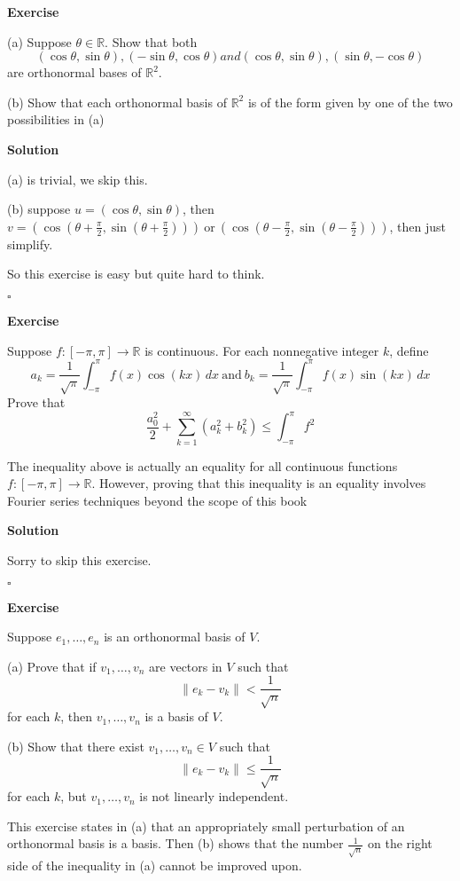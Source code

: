 \documentclass{article}
\newenvironment{exercise}{%
{\textbf{Exercise\\}
    }
}{
}
\newenvironment{solution}{%
{
    \textbf{Solution\\}
    }
}{
  \hfill $\square$ 
  \par\bigskip 
}
\newcommand{\RR}{\mathbb{R}}
\begin{document}
\begin{CJK}{UTF8}{gkai}
\begin{exercise}
    (a) Suppose $\theta \in \RR$. Show that both
    \[(\cos\theta,\sin\theta),(-\sin\theta,\cos\theta) and (\cos\theta,\sin\theta),(\sin\theta,-\cos\theta)\]
    are orthonormal bases of $\RR^2$.

    (b) Show that each orthonormal basis of $\RR^2$ is of the form given by one of the two possibilities in (a)
\end{exercise}

\begin{solution}
    (a) is trivial, we skip this.

    (b) suppose $u = (\cos \theta, \sin \theta)$, then $v = (\cos (\theta + \frac{\pi}{2}, \sin (\theta + \frac{\pi}{2}))) ~\text{or}~ (\cos (\theta - \frac{\pi}{2}, \sin (\theta - \frac{\pi}{2})))$, then just simplify.

    So this exercise is easy but quite hard to think.
\end{solution}
    
\begin{exercise}
    Suppose $f: [-\pi,\pi] \to \RR$ is continuous. For each nonnegative integer $k$, define
    \[a_k = \dfrac{1}{\sqrt{\pi}} \int_{-\pi}^{\pi}f(x)\cos(kx)\, dx ~\text{and}~ b_k = \dfrac{1}{\sqrt{\pi}} \int_{-\pi}^{\pi}f(x)\sin(kx)\, dx\]
    Prove that
    \[\dfrac{a_0^2}{2} + \sum_{k = 1}^\infty (a_k^2 + b_k^2) \leq  \int_{-\pi}^{\pi}f^2\]

    The inequality above is actually an equality for all continuous functions $f : [-\pi,\pi] \to \RR$. However, proving that this inequality is an equality involves Fourier series techniques beyond the scope of this book
\end{exercise}

\begin{solution}
    Sorry to skip this exercise.
\end{solution}

\begin{exercise}
    Suppose $e_1,\ldots,e_n$ is an orthonormal basis of $V$.

    (a) Prove that if $v_1,\ldots,v_n$ are vectors in $V$ such that
    \[\|e_k - v_k\| < \dfrac{1}{\sqrt{n}}\]
    for each $k$, then $v_1,\ldots,v_n$ is a basis of $V$.

    (b) Show that there exist $v_1,\ldots,v_n \in V$ such that
    \[\|e_k - v_k\| \leq  \dfrac{1}{\sqrt{n}}\]
    for each $k$, but $v_1,\ldots,v_n$ is not linearly independent.

    This exercise states in (a) that an appropriately small perturbation of an orthonormal basis is a basis. Then (b) shows that the number $\frac{1}{\sqrt{n}}$ on the right side of the inequality in (a) cannot be improved upon.
\end{exercise}


\end{CJK}
\end{document}

